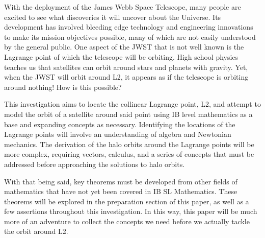 With the deployment of the James Webb Space Telescope, many people are excited to see what discoveries it will uncover about the Universe.
Its development has involved bleeding edge technology and engineering innovations to make its mission objectives possible\autocite{JWSTInnovation}, many of which are not easily understood by the general public. %
One aspect of the JWST that is not well known is the Lagrange point of which the telescope will be orbiting.
High school physics teaches us that satellites can orbit around stars and planets with gravity.
Yet, when the JWST will orbit around L2, it appears as if the telescope is orbiting around nothing!
How is this possible?

This investigation aims to locate the collinear Lagrange point, L2, and attempt to model the orbit of a satellite around said point using IB level mathematics as a base and expanding concepts as necessary.
Identifying the locations of the Lagrange points will involve an understanding of algebra and Newtonian mechanics.
The derivation of the halo orbits around the Lagrange points will be more complex, requiring vectors, calculus, and a series of concepts that must be addressed before approaching the solutions to halo orbits.

With that being said, key theorems must be developed from other fields of mathematics that have not yet been covered in IB SL Mathematics.
These theorems will be explored in the preparation section of this paper, as well as a few assertions throughout this investigation.
In this way, this paper will be much more of an adventure to collect the concepts we need before we actually tackle the orbit around L2.